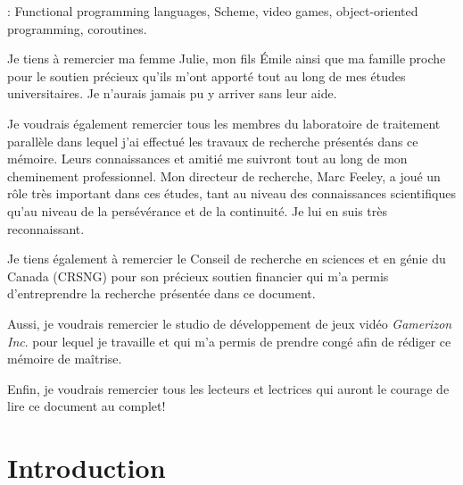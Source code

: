 \documentclass[12pt,twoside,letterpaper,francais]{book}
\begin{document}
\vspace{2em}

: Functional programming languages,
Scheme, video games, object-oriented programming, coroutines.



 
\tabledesmatieres

\listedestableaux

\listedesfigures


\remerciements

Je tiens à remercier ma femme Julie, mon fils Émile ainsi que ma
famille proche pour le soutien précieux qu'ils m'ont apporté tout au
long de mes études universitaires. Je n'aurais jamais pu y arriver
sans leur aide.

Je voudrais également remercier tous les membres du laboratoire de
traitement parallèle dans lequel j'ai effectué les travaux de
recherche présentés dans ce mémoire. Leurs connaissances et amitié me
suivront tout au long de mon cheminement professionnel. Mon directeur
de recherche, Marc Feeley, a joué un rôle très important dans ces
études, tant au niveau des connaissances scientifiques qu'au niveau de
la persévérance et de la continuité. Je lui en suis très
reconnaissant.

Je tiens également à remercier le Conseil de recherche en sciences et
en génie du Canada (CRSNG) pour son précieux soutien financier qui m'a
permis d'entreprendre la recherche présentée dans ce document.

Aussi, je voudrais remercier le studio de dévelop\-pement de jeux vidéo
\textit{Gamerizon Inc}. pour lequel je travaille et qui m'a permis de
prendre congé afin de rédiger ce mémoire de maîtrise.

Enfin, je voudrais remercier tous les lecteurs et lectrices qui auront
le courage de lire ce document au complet!



\chapter{Introduction} \label{Chap:Intro}
\debutchapitres
\end{document}
